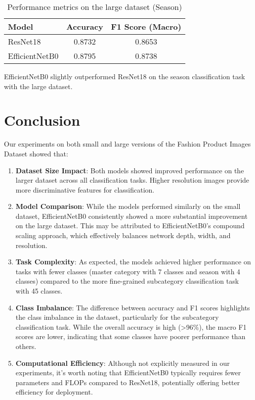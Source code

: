 \documentclass[10pt,journal,compsoc]{IEEEtran}
\begin{document}
\begin{table}[htbp]
\centering
\caption{Performance metrics on the large dataset (Season)}
\begin{tabular}{|l|c|c|}
\hline
\textbf{Model} & \textbf{Accuracy} & \textbf{F1 Score (Macro)} \\
\hline
ResNet18 & 0.8732 & 0.8653 \\
\hline
EfficientNetB0 & 0.8795 & 0.8738 \\
\hline
\end{tabular}
\end{table}

EfficientNetB0 slightly outperformed ResNet18 on the season classification task with the large dataset.

\section{Conclusion}
Our experiments on both small and large versions of the Fashion Product Images Dataset showed that:

\begin{enumerate}
\item \textbf{Dataset Size Impact}: Both models showed improved performance on the larger dataset across all classification tasks. Higher resolution images provide more discriminative features for classification.

\item \textbf{Model Comparison}: While the models performed similarly on the small dataset, EfficientNetB0 consistently showed a more substantial improvement on the large dataset. This may be attributed to EfficientNetB0's compound scaling approach, which effectively balances network depth, width, and resolution.

\item \textbf{Task Complexity}: As expected, the models achieved higher performance on tasks with fewer classes (master category with 7 classes and season with 4 classes) compared to the more fine-grained subcategory classification task with 45 classes.

\item \textbf{Class Imbalance}: The difference between accuracy and F1 scores highlights the class imbalance in the dataset, particularly for the subcategory classification task. While the overall accuracy is high (>96\%), the macro F1 scores are lower, indicating that some classes have poorer performance than others.

\item \textbf{Computational Efficiency}: Although not explicitly measured in our experiments, it's worth noting that EfficientNetB0 typically requires fewer parameters and FLOPs compared to ResNet18, potentially offering better efficiency for deployment.
\end{enumerate}
\end{document}
